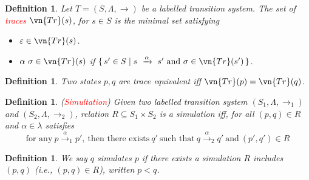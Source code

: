 \documentclass{article}
\newtheorem{definition}[theorem]{Definition}
\newcommand\Set[2]{\{\,#1\mid#2\,\}} %
\newcommand{\redt}[1]{\textcolor{red}{#1}}
\begin{document}
\begin{definition}
\rm \cite{ITLTS}Let $T=(S,\Lambda,\to)$ be a labelled transition system. The set of \redt{traces} $\vn{Tr}(s)$, for $s \in S$ is the minimal set satisfying
\begin{itemize}
	\item $\varepsilon \in \vn{Tr}(s)$.
	\item $\alpha~\sigma \in \vn{Tr}(s)$ if $\Set{s' \in S}{s~ \xrightarrow{\alpha}~s' ~\text{and}~\sigma \in \vn{Tr}(s')}$. 
\end{itemize}
\end{definition}

\begin{definition}
\rm Two states $p,q$ are trace equivalent iff $\vn{Tr}(p) = \vn{Tr}(q)$.
\end{definition}

\begin{definition}
\rm (\redt{Simultation}) Given two labelled transition system $(S_1, \Lambda, \to_1)$ and $(S_2, \Lambda, \to_2)$, relation $R \subseteq S_1 \times S_2$ is a simulation iff, for all $(p,q) \in R$ and $\alpha \in \lambda$ satisfies
\[
	\text{for any}~p \xrightarrow{\alpha}_1 p', ~\text{then there exists}~ q'~\text{such that}~q \xrightarrow{\alpha}_2 q'~\text{and}~(p',q') \in R 	
\]
\begin{center}
\end{center}
\end{definition}

\begin{definition}
\rm We say $q$ simulates $p$ if there exists a simulation $R$ includes $(p,q)$ (i.e., $(p,q) \in R$), written $p < q$.
\end{definition}
\end{document}
